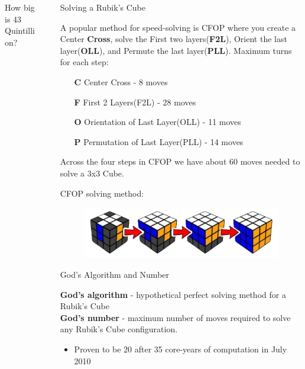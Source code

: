 \documentclass[final]{beamer}
\newlength{\sepwidth}
\newlength{\colwidth}
\newcommand{\separatorcolumn}{\begin{column}{\sepwidth}\end{column}}
\begin{document}
\begin{frame}[t]
\begin{columns}[t]
\begin{column}{\colwidth}
\begin{block}{How big is 43 Quintillion?}
  \end{block}

\end{column}

\separatorcolumn

\begin{column}{\colwidth}

  \begin{block}{Solving a Rubik's Cube}

    
    \large A popular method for speed-solving is CFOP where you create a Center \textbf{Cross}, solve the 
    First two layers(\textbf{F2L}), Orient the last layer(\textbf{OLL}), and Permute the last layer(\textbf{PLL}). 
   Maximum turns for each step: 

    \begin{enumerate}
      \item[\textbf{C}] Center Cross - 8 moves
      \item[\textbf{F}] First 2 Layers(F2L) - 28 moves
      \item[\textbf{O}] Orientation of Last Layer(OLL) - 11 moves
      \item[\textbf{P}] Permutation of Last Layer(PLL) - 14 moves
    \end{enumerate}

    Across the four steps in CFOP we have about 60 moves needed to solve a 3x3 Cube.

    \large CFOP solving method: 
    \begin{figure}
      \centering
      \includegraphics[scale = 0.8]{logos/CFOP.jpg}
    \end{figure}

  \end{block}

  \begin{block}{God's Algorithm and Number}

    \textbf{God's algorithm} - hypothetical perfect solving method for a Rubik's Cube  \\
    \textbf{God's number} - maximum number of moves required to solve any Rubik's Cube configuration. \\
    \begin{itemize}
      \item Proven to be 20 after 35 core-years of computation in July 2010
    \end{itemize}


\end{block}
\end{column}
\end{columns}
\end{frame}
\end{document}

